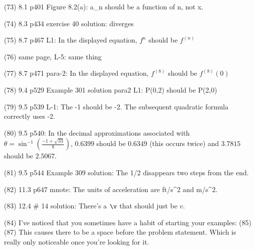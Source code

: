 {(73)  8.1 p401 Figure 8.2(a): a_n should be a function of n, not x.

(74)  8.3 p434 exercise 40 solution: diverges

(75)  8.7 p467 L1: In the displayed equation, $f^n$ should be $f^{(n)}$

(76)  same page, L-5: same thing

(77)  8.7 p471 para-2: In the displayed equation, $f^{(8)}$ should be $f^{(8)}(0)$

(78)  9.4 p529 Example 301 solution para2 L1: P(0,2) should be P(2,0)

(79)  9.5 p539 L-1: The -1 should be -2.  The subsequent quadratic formula correctly uses -2.

(80)  9.5 p540: In the decimal approximations associated with $\theta = \sin^{-1} (\frac{-1+\sqrt {33}}{8})$, $0.6399$ should be $0.6349$ (this occurs twice) and $3.7815$ should be $2.5067$.

(81)  9.5 p544 Example 309 solution: The 1/2 disappears two steps from the end.

(82)  11.3 p647 mnote: The units of acceleration are ft/s^2 and m/s^2.
 
(83)  12.4 # 14 solution: There's a $\v$ that should just be $v$.

(84)  I've noticed that you sometimes have a habit of starting your examples:
(85)  
(87)  This causes there to be a space before the problem statement.  Which is really only noticeable once you're looking for it.
%

}
